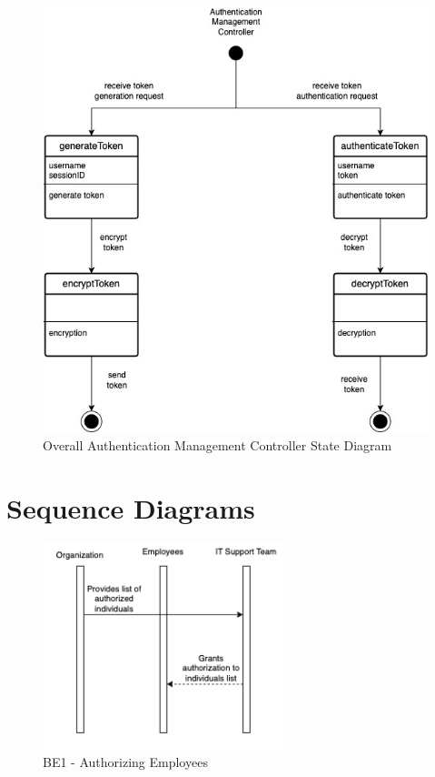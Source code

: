 \documentclass[]{article}
\begin{document}
\renewcommand{\thefigure}{2.\arabic{figure}}
\setcounter{figure}{2}
\begin{figure}[H]
	\centering
	\includegraphics[scale=0.75]{authenticaton-controller.jpg}
	\caption{Overall Authentication Management Controller State Diagram}
	\label{fig:authentication-controller}
\end{figure}

\section{Sequence Diagrams}
\label{sec:sequence_diagrams}

\renewcommand{\thefigure}{3.\arabic{figure}}
\setcounter{figure}{0}
\begin{figure}[H]
	\centering
	\includegraphics[width=7cm]{BE1.png}
	\caption{BE1 - Authorizing Employees}
	\label{fig:galaxy}
\end{figure}
\end{document}
